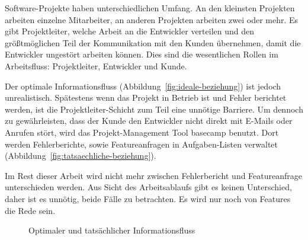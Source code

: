 Software-Projekte haben unterschiedlichen Umfang. An den kleinsten Projekten arbeiten einzelne Mitarbeiter, an anderen Projekten arbeiten zwei oder mehr. Es gibt Projektleiter, welche Arbeit an die Entwickler verteilen und den größtmöglichen Teil der Kommunikation mit den Kunden übernehmen, damit die Entwickler ungestört arbeiten können. Dies sind die wesentlichen Rollen im Arbeitsfluss: Projektleiter, Entwickler und Kunde.

Der optimale Informationsfluss (Abbildung~\ref{fig:ideale-beziehung}) ist jedoch unrealistisch. Spätestens wenn das Projekt in Betrieb ist und Fehler berichtet werden, ist die Projektleiter-Schicht zum Teil eine unnötige Barriere. Um dennoch zu gewährleisten, dass der Kunde den Entwickler nicht direkt mit E-Mails oder Anrufen stört, wird das Projekt-Management Tool \Gls{basecamp} benutzt. Dort werden Fehlerberichte, sowie Featureanfragen in Aufgaben-Listen verwaltet (Abbildung~\ref{fig:tatsaechliche-beziehung}).

Im Rest dieser Arbeit wird nicht mehr zwischen Fehlerbericht und Featureanfrage unterschieden werden. Aus Sicht des Arbeitsablaufs gibt es keinen Unterschied, daher ist es unnötig, beide Fälle zu betrachten. Es wird nur noch von Features die Rede sein.

\begin{figure}
	\centering
	
	\caption{ Optimaler und  tatsächlicher Informationsfluss}
	\label{fig:personen_beziehungen}
\end{figure}

